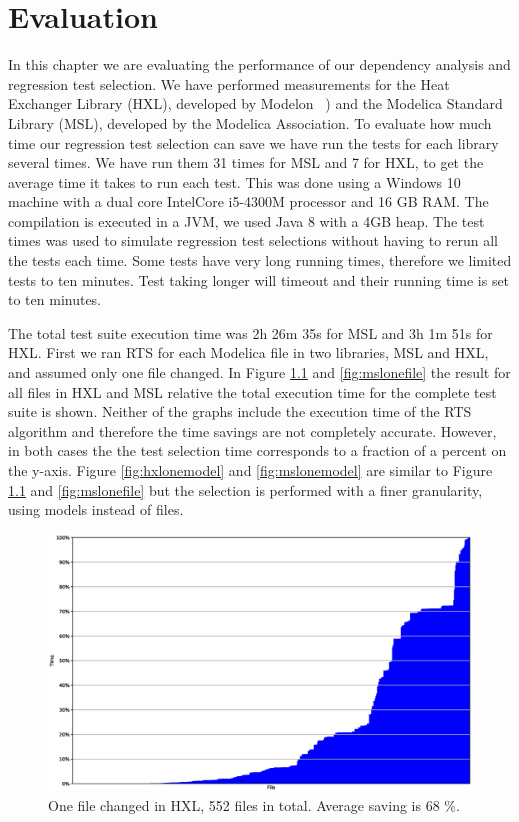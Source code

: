 \documentclass{cslthse-msc}
\begin{document}
\chapter[Evaluation]{Evaluation}
In this chapter we are evaluating the performance of our dependency analysis and regression test selection. We have performed measurements for the Heat Exchanger Library (HXL), developed by Modelon ~\cite{modelon.comHXL}) and the Modelica Standard Library (MSL), developed by the Modelica Association. To evaluate how much time our regression test selection can save we have run the tests for each library several times. We have run them 31 times for MSL and 7 for HXL, to get the average time it takes to run each test. This was done using a Windows 10 machine with a dual core Intel\textregistered Core \texttrademark i5-4300M processor and 16 GB RAM. The compilation is executed in a JVM, we used Java 8 with a 4GB heap. The test times was used to simulate regression test selections without having to rerun all the tests each time. Some tests have very long running times, therefore we limited tests to ten minutes. Test taking longer will timeout and their running time is set to ten minutes.

The total test suite execution time was 2h 26m 35s for MSL and 3h 1m 51s for HXL. First we ran RTS for each Modelica file in two libraries, MSL and HXL, and assumed only one file changed.  In Figure \ref{fig:hxlonefile} and \ref{fig:mslonefile} the result for all files in HXL and MSL relative the total execution time for the complete test suite is shown. Neither of the graphs include the execution time of the RTS algorithm and therefore the time savings are not completely accurate. However, in both cases the the test selection time corresponds to a fraction of a percent on the y-axis. Figure \ref{fig:hxlonemodel} and \ref{fig:mslonemodel} are similar to Figure \ref{fig:hxlonefile} and \ref{fig:mslonefile} but the selection is performed with a finer granularity, using models instead of files. 

\begin{figure}[!htbp]
    \centering
    \includegraphics[width=\textwidth]{Graphs/HXL_one_file.eps}
    \caption{One file changed in HXL, 552 files in total. Average saving is 68 \%.}
    \label{fig:hxlonefile}
\end{figure}
\end{document}
